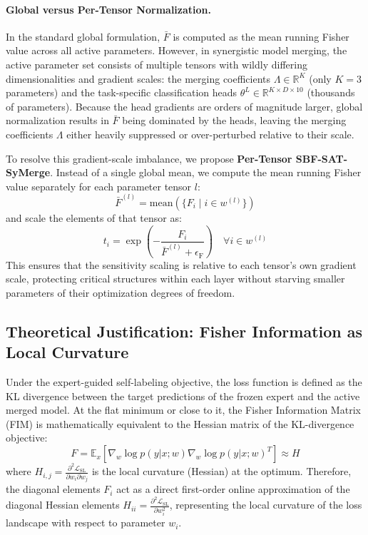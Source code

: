 \documentclass{article}
\theoremstyle{plain}
\theoremstyle{definition}
\theoremstyle{remark}
\begin{document}
\paragraph{Global versus Per-Tensor Normalization.} 
In the standard global formulation, $\bar{F}$ is computed as the mean running Fisher value across all active parameters. However, in synergistic model merging, the active parameter set consists of multiple tensors with wildly differing dimensionalities and gradient scales: the merging coefficients $\Lambda \in \mathbb{R}^K$ (only $K=3$ parameters) and the task-specific classification heads $\theta^L \in \mathbb{R}^{K \times D \times 10}$ (thousands of parameters). Because the head gradients are orders of magnitude larger, global normalization results in $\bar{F}$ being dominated by the heads, leaving the merging coefficients $\Lambda$ either heavily suppressed or over-perturbed relative to their scale.

To resolve this gradient-scale imbalance, we propose \textbf{Per-Tensor SBF-SAT-SyMerge}. Instead of a single global mean, we compute the mean running Fisher value separately for each parameter tensor $l$:
$$\bar{F}^{(l)} = \text{mean}(\{ F_i \mid i \in w^{(l)} \})$$
and scale the elements of that tensor as:
$$t_i = \exp\left( - \frac{F_i}{\bar{F}^{(l)} + \epsilon_{\text{F}}} \right) \quad \forall i \in w^{(l)}$$
This ensures that the sensitivity scaling is relative to each tensor's own gradient scale, protecting critical structures within each layer without starving smaller parameters of their optimization degrees of freedom.

\subsection{Theoretical Justification: Fisher Information as Local Curvature}
Under the expert-guided self-labeling objective, the loss function is defined as the KL divergence between the target predictions of the frozen expert and the active merged model.
At the flat minimum or close to it, the Fisher Information Matrix (FIM) is mathematically equivalent to the Hessian matrix of the KL-divergence objective:
$$F = \mathbb{E}_{x} \left[ \nabla_w \log p(y|x; w) \nabla_w \log p(y|x; w)^T \right] \approx H$$
where $H_{i,j} = \frac{\partial^2 \mathcal{L}_{\text{SL}}}{\partial w_i \partial w_j}$ is the local curvature (Hessian) at the optimum.
Therefore, the diagonal elements $F_i$ act as a direct first-order online approximation of the diagonal Hessian elements $H_{ii} = \frac{\partial^2 \mathcal{L}_{\text{SL}}}{\partial w_i^2}$, representing the local curvature of the loss landscape with respect to parameter $w_i$.
\end{document}
